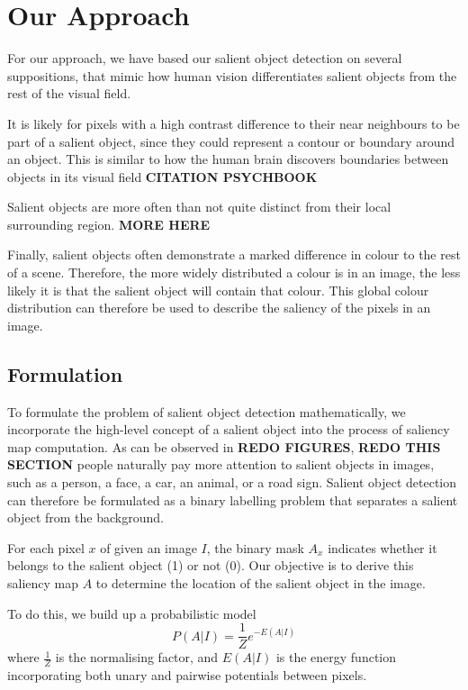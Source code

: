 \documentclass[10pt,twocolumn,letterpaper]{article}
\newcommand{\BOLD}{\textbf}
\begin{document}
\section{Our Approach}

For our approach, we have based our salient object detection on several suppositions, that mimic how human vision differentiates salient objects from the rest of the visual field.

It is likely for pixels with a high contrast difference to their near neighbours to be part of a salient object, since they could represent a contour or boundary around an object.  This is similar to how the human brain discovers boundaries between objects in its visual field \BOLD{CITATION PSYCHBOOK}

Salient objects are more often than not quite distinct from their local surrounding region.  \BOLD{MORE HERE}

Finally, salient objects often demonstrate a marked difference in colour to the rest of a scene.  Therefore, the more widely distributed a colour is in an image, the less likely it is that the salient object will contain that colour.  This global colour distribution can therefore be used to describe the saliency of the pixels in an image.

\subsection{Formulation}

To formulate the problem of salient object detection mathematically, we incorporate the high-level concept of a salient object into the process of saliency map computation. As can be observed in \BOLD{REDO FIGURES}, \BOLD{REDO THIS SECTION} people naturally pay more attention to salient objects in images, such as a person, a face, a car, an animal, or a road sign. Salient object detection can therefore be formulated as a binary labelling problem that separates a salient object from the background. 

For each pixel $x$ of given an image $I$, the binary mask $A_x$ indicates whether it belongs to the salient object (1) or not (0). Our objective is to derive this saliency map $A$ to determine the location of the salient object in the image.

To do this, we build up a probabilistic model $$P(A|I)=\frac{1}{Z}e^{-E(A|I)}$$ where $\frac{1}{Z}$ is the normalising factor, and $E(A|I)$ is the energy function incorporating both unary and pairwise potentials between pixels.
\end{document}
